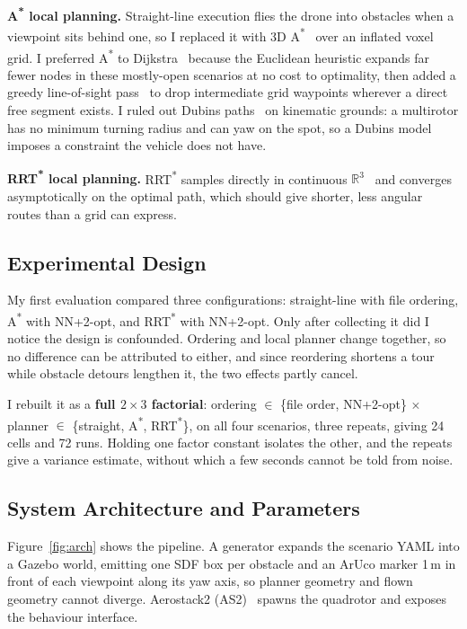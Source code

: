 \documentclass[11pt,a4paper]{article}
\begin{document}
\textbf{A\textsuperscript{*} local planning.} Straight-line execution flies the drone into obstacles when a viewpoint sits behind one, so I replaced it with 3D A\textsuperscript{*}~\cite{hart1968formal} over an inflated voxel grid. I preferred A\textsuperscript{*} to Dijkstra~\cite{dijkstra1959note} because the Euclidean heuristic expands far fewer nodes in these mostly-open scenarios at no cost to optimality, then added a greedy line-of-sight pass~\cite{daniel2010theta} to drop intermediate grid waypoints wherever a direct free segment exists. I ruled out Dubins paths~\cite{dubins1957curves} on kinematic grounds: a multirotor has no minimum turning radius and can yaw on the spot, so a Dubins model imposes a constraint the vehicle does not have.

\textbf{RRT\textsuperscript{*} local planning.} RRT\textsuperscript{*} samples directly in continuous $\mathbb{R}^3$~\cite{karaman2011sampling,lavalle1998rapidly} and converges asymptotically on the optimal path, which should give shorter, less angular routes than a grid can express.

\subsection{Experimental Design}

My first evaluation compared three configurations: straight-line with file ordering, A\textsuperscript{*} with NN+2-opt, and RRT\textsuperscript{*} with NN+2-opt. Only after collecting it did I notice the design is confounded. Ordering and local planner change together, so no difference can be attributed to either, and since reordering shortens a tour while obstacle detours lengthen it, the two effects partly cancel.

I rebuilt it as a \textbf{full $2\times3$ factorial}: ordering $\in$ \{file order, NN+2-opt\} $\times$ planner $\in$ \{straight, A\textsuperscript{*}, RRT\textsuperscript{*}\}, on all four scenarios, three repeats, giving 24 cells and 72 runs. Holding one factor constant isolates the other, and the repeats give a variance estimate, without which a few seconds cannot be told from noise.

\subsection{System Architecture and Parameters}

Figure~\ref{fig:arch} shows the pipeline. A generator expands the scenario YAML into a Gazebo world, emitting one SDF box per obstacle and an ArUco marker 1\,m in front of each viewpoint along its yaw axis, so planner geometry and flown geometry cannot diverge. Aerostack2 (AS2)~\cite{fernandez2023aerostack2} spawns the quadrotor and exposes the behaviour interface.
\end{document}
